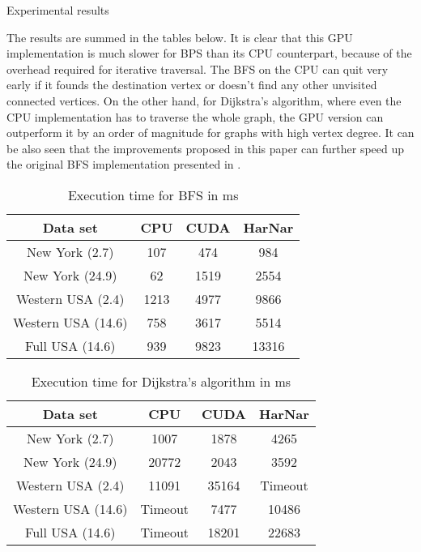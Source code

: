 \documentclass[a4paper,12pt,notitlepage,oneside]{article}
\newcommand{\parspace}[1][]{
	\ifthenelse{\isempty{#1}}{\vspace{5mm}}{\vspace{#1}}
	\par
}
\begin{document}
\begin{section}{Experimental results}
\parspace The results are summed in the tables below. It is clear that this GPU implementation is much slower for BPS than its CPU counterpart, because of
the overhead required for iterative traversal. The BFS on the CPU can quit very early if it founds the destination vertex or doesn't find any other unvisited
connected vertices. On the other hand, for Dijkstra's algorithm, where even the CPU implementation has to traverse the whole graph, the GPU version
can outperform it by an order of magnitude for graphs with high vertex degree. It can be also seen that the improvements proposed in this paper can further
speed up the original BFS implementation presented in \cite{harnar}.

\begin{table}[H]
\centering
\caption{Execution time for BFS in ms}
\begin{tabular}{|c|c|c|c|}
\hline
Data set           & CPU  & CUDA & HarNar \\ \hline
New York (2.7)     & 107  & 474  & 984    \\ \hline
New York (24.9)    & 62   & 1519 & 2554   \\ \hline
Western USA (2.4)  & 1213 & 4977 & 9866   \\ \hline
Western USA (14.6) & 758  & 3617 & 5514   \\ \hline
Full USA (14.6)    & 939  & 9823 & 13316  \\ \hline
\end{tabular}
\end{table}

\begin{table}[H]
\centering
\caption{Execution time for Dijkstra's algorithm in ms}
\begin{tabular}{|c|c|c|c|}
\hline
Data set           & CPU  & CUDA & HarNar \\ \hline
New York (2.7)     & 1007  & 1878  & 4265    \\ \hline
New York (24.9)    & 20772   & 2043 & 3592   \\ \hline
Western USA (2.4)  & 11091 & 35164 & Timeout   \\ \hline
Western USA (14.6) & Timeout  & 7477 & 10486   \\ \hline
Full USA (14.6)    & Timeout  & 18201 & 22683  \\ \hline
\end{tabular}
\end{table}

\end{section}
\end{document}
